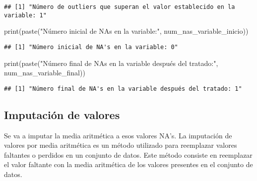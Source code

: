 \documentclass[
]{article}
\newenvironment{Shaded}{\begin{snugshade}}{\end{snugshade}}
\newcommand{\AttributeTok}[1]{\textcolor[rgb]{0.77,0.63,0.00}{#1}}
\newcommand{\CommentTok}[1]{\textcolor[rgb]{0.56,0.35,0.01}{\textit{#1}}}
\newcommand{\DecValTok}[1]{\textcolor[rgb]{0.00,0.00,0.81}{#1}}
\newcommand{\FunctionTok}[1]{\textcolor[rgb]{0.00,0.00,0.00}{#1}}
\newcommand{\NormalTok}[1]{#1}
\newcommand{\OtherTok}[1]{\textcolor[rgb]{0.56,0.35,0.01}{#1}}
\newcommand{\SpecialCharTok}[1]{\textcolor[rgb]{0.00,0.00,0.00}{#1}}
\newcommand{\StringTok}[1]{\textcolor[rgb]{0.31,0.60,0.02}{#1}}
\begin{document}
\begin{verbatim}
## [1] "Número de outliers que superan el valor establecido en la variable: 1"
\end{verbatim}

\begin{Shaded}
\begin{Highlighting}[]
\FunctionTok{print}\NormalTok{(}\FunctionTok{paste}\NormalTok{(}\StringTok{"Número inicial de NA\textquotesingle{}s en la variable:"}\NormalTok{, num\_nas\_variable\_inicio))}
\end{Highlighting}
\end{Shaded}

\begin{verbatim}
## [1] "Número inicial de NA's en la variable: 0"
\end{verbatim}

\begin{Shaded}
\begin{Highlighting}[]
\FunctionTok{print}\NormalTok{(}\FunctionTok{paste}\NormalTok{(}\StringTok{"Número final de NA\textquotesingle{}s en la variable después del tratado:"}\NormalTok{, num\_nas\_variable\_final))}
\end{Highlighting}
\end{Shaded}

\begin{verbatim}
## [1] "Número final de NA's en la variable después del tratado: 1"
\end{verbatim}

\hypertarget{imputaciuxf3n-de-valores}{%
\subsection{Imputación de valores}\label{imputaciuxf3n-de-valores}}

Se va a imputar la media aritmética a esos valores NA's. La imputación
de valores por media aritmética es un método utilizado para reemplazar
valores faltantes o perdidos en un conjunto de datos. Este método
consiste en reemplazar el valor faltante con la media aritmética de los
valores presentes en el conjunto de datos.

\begin{Shaded}
\end{Shaded}
\end{document}

